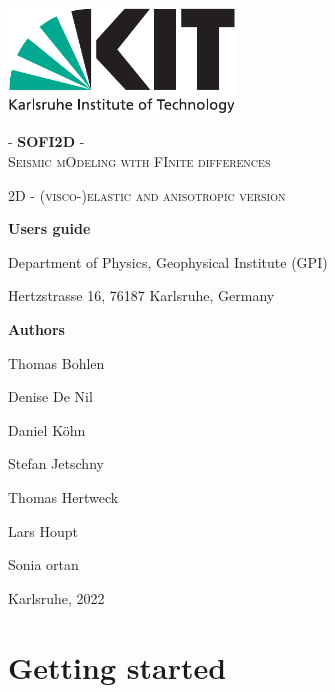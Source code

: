 \documentclass[11pt,english,a4paper]{article}
\begin{document}
\pagecolor{lightgray}\afterpage{\nopagecolor}
\begin{titlepage}
       	\centering
    {\includegraphics[height=2.8cm]{figures/kitlogo_en_cmyk}}
    
	\vspace{2cm}
	
	\textsc{\Huge - \textbf{SOFI2D} -\\ Seismic mOdeling with FInite differences\\}
	
	\vspace{1cm}
	
	\textsc{\huge 2D - (visco-)elastic and anisotropic version}
	
	\vspace{1cm}
	
	{\large \textbf{Users guide}\par}
	\vspace{1cm}
 	Department of Physics, Geophysical Institute (GPI)\par
	Hertzstrasse 16, 76187 Karlsruhe, Germany\par
	\vspace{1.5cm}
	{\large \textbf{Authors}\par} 
	Thomas Bohlen\par
	Denise De Nil \par
	Daniel K\"ohn \par
	Stefan Jetschny \par
    Thomas Hertweck \par 
    Lars Houpt \par 
    Sonia ortan\par
    \vspace{1cm}
    {\large Karlsruhe, 2022\par}
\end{titlepage}

\thispagestyle{empty}
\cleardoublepage

\tableofcontents
\newpage

\section{Getting started}
\end{document}
